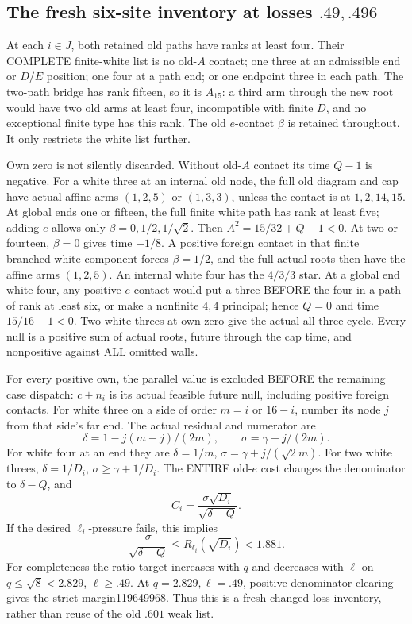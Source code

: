 \documentclass[11pt]{article}
\begin{document}
\subsection[The fresh six-site inventory at losses .49,.496]{The fresh six-site inventory at losses \(.49,.496\)}
\label{app:arithA15freshinventory}

At each \(i\in J\), both retained old paths have ranks at
least four.
Their COMPLETE finite-white list is no old-\(A\) contact;
one three at an admissible end or \(D/E\) position;
one four at a path end; or one endpoint three in each path.
The two-path bridge has rank fifteen, so it is \(A_{15}\):
a third arm through the new root would have two old arms at
least four, incompatible with finite \(D\), and no exceptional
finite type has this rank.
The old \(e\)-contact \(\beta\) is retained throughout.
It only restricts the white list further.

Own zero is not silently discarded.
Without old-\(A\) contact its time \(Q-1\) is negative.
For a white three at an internal old node, the full old diagram
and cap have actual affine arms \((1,2,5)\) or \((1,3,3)\),
unless the contact is at \(1,2,14,15\).
At global ends one or fifteen, the full finite white path
has rank at least five; adding \(e\) allows only
\(\beta=0,1/2,1/\sqrt2\).
Then \(A^2=15/32+Q-1<0\).
At two or fourteen, \(\beta=0\) gives time \(-1/8\).
A positive foreign contact in that finite branched white
component forces \(\beta=1/2\), and the full actual roots
then have the affine arms \((1,2,5)\).
An internal white four has the \(4/3/3\) star.
At a global end white four, any positive \(e\)-contact would
put a three BEFORE the four in a path of rank at least six,
or make a nonfinite \(4,4\) principal; hence \(Q=0\) and
time \(15/16-1<0\).
Two white threes at own zero give the actual all-three cycle.
Every null is a positive sum of actual roots, future through
the cap time, and nonpositive against ALL omitted walls.

For every positive own, the parallel value is excluded BEFORE
the remaining case dispatch: \(c+n_i\) is its actual feasible
future null, including positive foreign contacts.
For white three on a side of order \(m=i\) or \(16-i\),
number its node \(j\) from that side's far end.
The actual residual and numerator are
\[
 \delta=1-j(m-j)/(2m),\qquad \sigma=\gamma+j/(2m).
\]
For white four at an end they are
\(\delta=1/m\), \(\sigma=\gamma+j/(\sqrt2m)\).
For two white threes, \(\delta=1/D_i\),
\(\sigma\ge\gamma+1/D_i\).
The ENTIRE old-\(e\) cost changes the denominator to
\(\delta-Q\), and
\[
                   C_i={\frac{\sigma\sqrt{D_i}}{\sqrt{\delta-Q}}} .
\]
If the desired \(\ell_i\)-pressure fails, this implies
\[
 {\frac{\sigma}{\sqrt{\delta-Q}}}
       \le R_{\ell_i}(\sqrt{D_i})<1.881 .
\tag{A15ratio}\label{eq:arithA15ratio}
\]
For completeness the ratio target increases with \(q\) and
decreases with \(\ell\) on \(q\le\sqrt8<2.829\),
\(\ell\ge.49\).
At \(q=2.829,\ell=.49\), positive denominator clearing gives
the strict margin119649968.
Thus this is a fresh changed-loss inventory, rather than
reuse of the old \(.601\) weak list.
\end{document}
